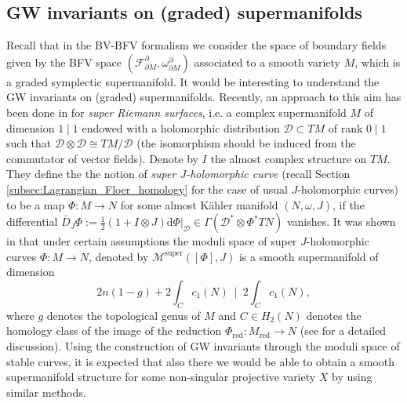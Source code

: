 \documentclass[11pt,colorinlistoftodos]{amsart}
\numberwithin{equation}{subsection}
\theoremstyle{plain}
\theoremstyle{definition}
\theoremstyle{remark}
\newcommand{\calD}{\mathcal{D}}
\newcommand{\dd}{{\mathrm{d}}}
\newcommand{\de}{\partial}
\newcommand{\calM}{\mathcal{M}}
\newcommand{\calF}{\mathcal{F}}
\begin{document}
\subsection{GW invariants on (graded) supermanifolds}
Recall that in the BV-BFV formalism we consider the space of boundary fields given by the BFV space $(\calF^\de_{\de M},\omega^\de_{\de M})$ associated to a smooth variety $M$, which is a graded symplectic supermanifold. It would be interesting to understand the GW invariants on (graded) supermanifolds. Recently, an approach to this aim has been done in \cite{KesslerSheshmaniYau2020} for \emph{super Riemann surfaces}, i.e. a complex supermanifold $M$ of dimension $1\mid 1$ endowed with a holomorphic distribution $\calD\subset TM$ of rank $0\mid 1$ such that $\calD\otimes \calD\cong TM/\calD$ (the isomorphism should be induced from the commutator of vector fields). Denote by $I$ the almost complex structure on $TM$. They define the the notion of \emph{super $J$-holomorphic curve} (recall Section \ref{subsec:Lagrangian_Floer_homology} for the case of usual $J$-holomorphic curves) to be a map $\Phi\colon M\to N$ for some almost K\"ahler manifold $(N,\omega,J)$, if the differential $\bar D_J\Phi:=\frac{1}{2}(1+I\otimes J)\dd\Phi\Big|_{\calD}\in \Gamma(\calD^*\otimes \Phi^*TN)$ vanishes. 
It was shown in \cite{KesslerSheshmaniYau2020} that under certain assumptions the moduli space of super $J$-holomorphic curves $\Phi\colon M\to N$, denoted by $\calM^{\mathrm{super}}([\Phi],J)$ is a smooth supermanifold of dimension 
\[
2n(1-g)+2\int_Cc_1(N)\,\,\,\Big|\,\,\, 2\int_C c_1(N),
\]
where $g$ denotes the topological genus of $M$ and $C\in H_2(N)$ denotes the homology class of the image of the reduction $\Phi_\mathrm{red}\colon M_\mathrm{red}\to N$ (see \cite{KesslerSheshmaniYau2020} for a detailed discussion). Using the construction of GW invariants through the moduli space of stable curves, it is expected that also there we would be able to obtain a smooth supermanifold structure for some non-singular projective variety $X$ by using similar methods. 


\end{document}
